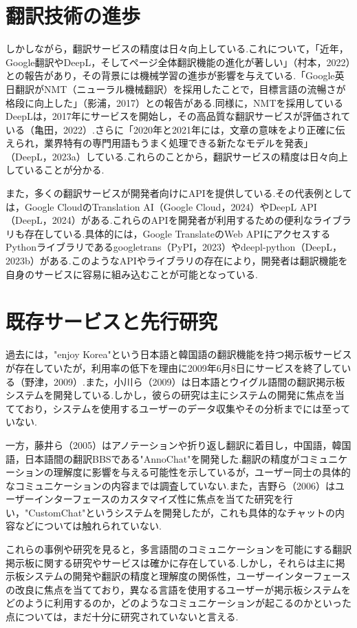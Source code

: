\documentclass[b5paper,12pt,dvipdfmx]{jsreport}
\begin{document}
\section{翻訳技術の進歩}

しかしながら，翻訳サービスの精度は日々向上している.これについて，「近年，Google翻訳やDeepL，そしてページ全体翻訳機能の進化が著しい」（村本，2022）との報告があり，その背景には機械学習の進歩が影響を与えている.「Google英日翻訳がNMT（ニューラル機械翻訳）を採用したことで，目標言語の流暢さが格段に向上した」（影浦，2017）との報告がある.同様に，NMTを採用しているDeepLは，2017年にサービスを開始し，その高品質な翻訳サービスが評価されている（亀田，2022）.さらに「2020年と2021年には，文章の意味をより正確に伝えられ，業界特有の専門用語もうまく処理できる新たなモデルを発表」（DeepL，2023a）している.これらのことから，翻訳サービスの精度は日々向上していることが分かる.

また，多くの翻訳サービスが開発者向けにAPIを提供している.その代表例としては，Google CloudのTranslation AI（Google Cloud，2024）やDeepL API（DeepL，2024）がある.これらのAPIを開発者が利用するための便利なライブラリも存在している.具体的には，Google TranslateのWeb APIにアクセスするPythonライブラリであるgoogletrans（PyPI，2023）やdeepl-python（DeepL，2023b）がある.このようなAPIやライブラリの存在により，開発者は翻訳機能を自身のサービスに容易に組み込むことが可能となっている.

\section{既存サービスと先行研究}

過去には，"enjoy Korea"という日本語と韓国語の翻訳機能を持つ掲示板サービスが存在していたが，利用率の低下を理由に2009年6月8日にサービスを終了している（野津，2009）.また，小川ら（2009）は日本語とウイグル語間の翻訳掲示板システムを開発している.しかし，彼らの研究は主にシステムの開発に焦点を当てており，システムを使用するユーザーのデータ収集やその分析までには至っていない.

一方，藤井ら（2005）はアノテーションや折り返し翻訳に着目し，中国語，韓国語，日本語間の翻訳BBSである"AnnoChat"を開発した.翻訳の精度がコミュニケーションの理解度に影響を与える可能性を示しているが，ユーザー同士の具体的なコミュニケーションの内容までは調査していない.また，吉野ら（2006）はユーザーインターフェースのカスタマイズ性に焦点を当てた研究を行い，"CustomChat"というシステムを開発したが，これも具体的なチャットの内容などについては触れられていない.

これらの事例や研究を見ると，多言語間のコミュニケーションを可能にする翻訳掲示板に関する研究やサービスは確かに存在している.しかし，それらは主に掲示板システムの開発や翻訳の精度と理解度の関係性，ユーザーインターフェースの改良に焦点を当てており，異なる言語を使用するユーザーが掲示板システムをどのように利用するのか，どのようなコミュニケーションが起こるのかといった点については，まだ十分に研究されていないと言える.
\end{document}

